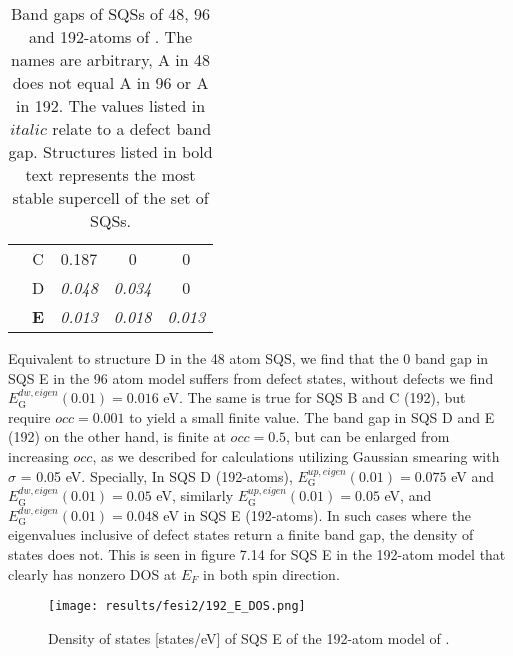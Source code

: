 \begin{table}[H]
\begin{tabular}{@{}ccccc@{}}
\multicolumn{1}{c|}{}                     & C          & 0.187                                                                         & 0                                                                              & 0                                                                               \\
\multicolumn{1}{c|}{}                     & D          & \textit{0.048}                                                                & \textit{0.034}                                                                         & 0                                                                              \\
\multicolumn{1}{c|}{}                     & \textbf{E} & \textit{0.013}                                                                & \textit{0.018}                                                                         & \textit{0.013}                                                                          \\ \bottomrule 
\end{tabular}
\caption{Band gaps of SQSs of 48, 96 and 192-atoms of . The names are arbitrary, A in 48 does not equal A in 96 or A in 192. The values listed in $italic$ relate to a defect band gap. Structures listed in bold text represents the most stable supercell of the set of SQSs.}
\end{table}

Equivalent to structure D in the 48 atom SQS, we find that the 0 band gap in SQS E in the 96 atom model suffers from defect states, without defects we find $E_\text{G} ^{dw, eigen}(0.01) = 0.016$ eV. The same is true for SQS B and C (192), but require $occ = 0.001$ to yield a small finite value. The band gap in SQS D and E (192) on the other hand, is finite at $occ = 0.5$, but can be enlarged from increasing $occ$, as we described for calculations utilizing Gaussian smearing with $\sigma$ = 0.05 eV. Specially, In SQS D (192-atoms), $E_\text{G} ^{up, eigen}(0.01) = 0.075$ eV and $E_\text{G} ^{dw, eigen}(0.01) = 0.05$ eV, similarly $E_\text{G} ^{up, eigen}(0.01) = 0.05$ eV, and $E_\text{G} ^{dw, eigen}(0.01) = 0.048$ eV in SQS E (192-atoms). In such cases where the eigenvalues inclusive of defect states return a finite band gap, the density of states does not. This is seen in figure 7.14 for SQS E in the 192-atom model that clearly has nonzero DOS at $E_F$ in both spin direction. 

\begin{figure}[H]
\centering
\texttt{[image: results/fesi2/192\_E\_DOS.png]}
\caption{Density of states [states/eV] of SQS E of the 192-atom model of .}
\end{figure}    
 
